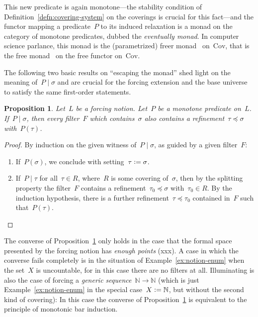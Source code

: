 \documentclass[com,11pt,crcready]{iosart2x}
\theoremstyle{definition}
\theoremstyle{plain}
\newtheorem{proposition}[definition]{Proposition}
\theoremstyle{remark}
\newcommand{\NN}{\mathbb{N}}
\newcommand{\defeq}{\vcentcolon=}
\newcommand{\Cov}{\mathrm{Cov}}
\renewcommand{\_}{\mathpunct{.}\,}
\begin{document}
This new predicate is again monotone---the stability condition of
Definition~\ref{defn:covering-system} on the coverings is
crucial for this fact---and the functor mapping a predicate~$P$ to its induced
relaxation is a monad on the category of monotone predicates, dubbed the
\emph{eventually monad}. In computer science parlance, this monad is
the (parametrized) freer monad~\cite{kiselyov-ishii:freer,apfelmus:operational}
on~$\Cov$, that is the free monad~\cite[Section~6]{swierstra:carte}
on the free functor on~$\Cov$.

The following two basic results on ``escaping the monad'' shed light on the
meaning of~$P \mid \sigma$ and are crucial for the forcing extension and the
base universe to satisfy the same first-order statements.

\begin{proposition}\label{prop:ev-points}Let~$L$ be a forcing notion. Let~$P$
be a monotone predicate on~$L$. If~$P \mid \sigma$, then every filter~$F$ which
contains~$\sigma$ also contains a refinement~$\tau \preceq \sigma$
with~$P(\tau)$.
\end{proposition}

\begin{proof}By induction on the given witness of~$P \mid \sigma$, as guided by
a given filter~$F$:
\begin{enumerate}
\item If~$P(\sigma)$, we conclude with setting~$\tau \defeq \sigma$.
\item If~$P \mid \tau$ for all~$\tau \in R$, where~$R$ is some covering
of~$\sigma$, then by the splitting property the filter~$F$ contains a refinement~$\tau_0
\preceq \sigma$ with~$\tau_0 \in R$. By the induction hypothesis, there is a
further refinement~$\tau \preceq \tau_0$ contained in~$F$ such that~$P(\tau)$.\qedhere
\end{enumerate}
\end{proof}

The converse of Proposition~\ref{prop:ev-points} only holds in the case that
the formal space presented by the forcing notion has \emph{enough points}
(xxx). A case in which the converse fails completely is in the situation of
Example~\ref{ex:notion-enum} when the set~$X$ is uncountable, for in this case
there are no filters at all. Illuminating is also the case of forcing a
\emph{generic sequence}~$\NN \to \NN$ (which is just
Example~\ref{ex:notion-enum} in the special case~$X \defeq \NN$, but without
the second kind of covering): In this case the converse of
Proposition~\ref{prop:ev-points} is equivalent to the principle of monotonic
bar induction.
\end{document}
